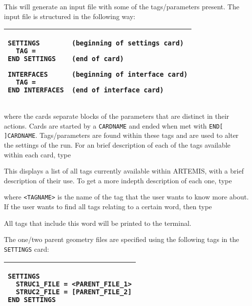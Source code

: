 \documentclass[12pt,a4paper,onecolumn,titlepage]{report}
\newcommand{\code}[2][]{\texttt{#2}}
\newcommand{\codeline}[2][]{\hspace{2em}{\tt#2}}
\newcommand{\artemis}{{ARTEMIS}}
\begin{document}
\codeline{artemis -d param.in}

\noindent
This will generate an input file with some of the tags/parameters present. The input file is structured in the following way:

\begin{tabular}{p{\linewidth}}
\hline
\vspace{-1em}
\begin{verbatim}
SETTINGS        (beginning of settings card)
  TAG = 
END SETTINGS    (end of card)

INTERFACES      (beginning of interface card)
  TAG = 
END INTERFACES  (end of interface card)
\end{verbatim}
\tabularnewline [-2em]
\hline
\end{tabular}

\noindent
where the cards separate blocks of the parameters that are distinct in their actions. Cards are started by a \code{CARDNAME} and ended when met with \code{END[ ]CARDNAME}. Tags/parameters are found within these tags and are used to alter the settings of the run. For an brief description of each of the tags available within each card, type

\codeline{artemis --help all}

\noindent
This displays a list of all tags currently available within \artemis{}, with a brief description of their use. To get a more indepth description of each one, type

\codeline{artemis --help <TAGNAME>}

\noindent
where \code{<TAGNAME>} is the name of the tag that the user wants to know more about. If the user wants to find all tags relating to a certain word, then type

\codeline{artemis --search <WORD>}

\noindent
All tags that include this word will be printed to the terminal.

The one/two parent geometry files are specified using the following tags in the \code{SETTINGS} card:

\begin{tabular}{p{\linewidth}}
\hline
\vspace{-1em}
\begin{verbatim}
SETTINGS
  STRUC1_FILE = <PARENT_FILE_1>
  STRUC2_FILE = [PARENT_FILE_2]
END SETTINGS
\end{verbatim}
\tabularnewline [-2em]
\hline
\end{tabular}
\end{document}
